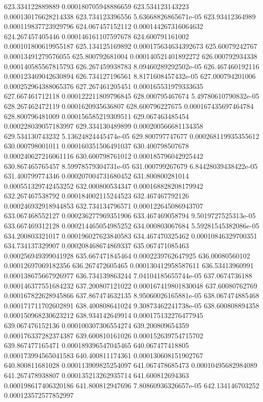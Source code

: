 {623.334122889889 0.000180705948886659
623.534123143223 0.000130176628214338
623.734123396556 5.63668826865671e-05
623.93412364989 0.000119837723929796
624.067457152112 0.000144267316064632
624.267457405446 0.000146161107597678
624.600791161002 0.000101800619955187
625.134125169892 0.000175634634392673
625.60079242767 0.00013491279576055
625.800792681004 0.000140521401892272
626.000792934338 0.000140585567815793
626.267459938783 8.09460289292502e-05
626.467460192116 0.000123469042630894
626.734127196561 8.8171608457432e-05
627.000794201006 0.000252964388065376
627.267461205451 0.000165531979333635
627.667461712118 0.000122211809796845
628.000795467674 5.49780610790832e-05
628.267462472119 0.0001620935636807
628.600796227675 0.000167435697464784
628.800796481009 0.000156585219309511
629.067463485454 0.000228039057183997
629.334130489899 0.000200566681134358
629.534130743232 5.13624824445474e-05
629.800797747677 0.000268119935355612
630.000798001011 0.000160351506491037
630.400798507678 0.000240627216061116
630.600798761012 0.000185796042925442
630.867465765457 8.59978579304731e-05
631.000799267679 6.84428039438422e-05
631.400799774346 0.000207004731680452
631.800800281014 0.000551329742453252
632.000800534347 0.000168828208179942
632.267467538792 0.000184002115244523
632.467467792126 0.000246932918944853
632.734134796571 0.000122645086943707
633.067468552127 0.000236277969351906
633.467469058794 9.5019727525313e-05
633.667469312128 0.000214465054985252
634.000803067684 5.59281545382086e-05
634.200803321017 0.000196027623840583
634.467470325462 0.00010846329700351
634.734137329907 0.000208468674869337
635.067471085463 0.000256949399041928
635.667471845464 0.0002239762647925
636.00080560102 0.00012697069182356
636.267472605465 0.000130412958587611
636.53413960991 0.000138675667926977
636.734139863244 7.04104185655744e-05
637.0674736188 0.000146377551684232
637.200807121022 0.000167419801830048
637.60080762769 0.000167822628945866
637.867474632135 8.95060026165881e-05
638.067474885468 0.000171711702602891
638.400808641024 9.30873462241738e-05
638.600808894358 0.000150968230623212
638.934142649914 0.000175132276477945
639.067476152136 0.000100307306554274
639.200809654359 0.000176337282374387
639.600810161026 0.000152639754715702
639.867477165471 0.000189396547045465
640.067477418805 0.000173994565041583
640.400811174361 0.000130608151902767
640.800811681028 0.000113909825254097
641.067478685473 0.00010495682984089
641.267478938807 0.000135213262935714
641.600812694363 0.000198617406320186
641.800812947696 7.80860936326657e-05
642.134146703252 0.000123572577852997
}
